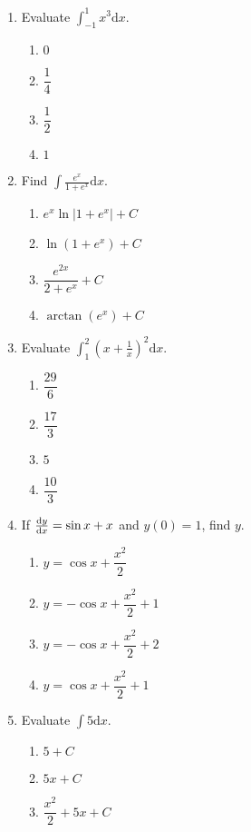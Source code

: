 \begin{multicols}{2}
\begin{enumerate}[label={\arabic*.}]
    \item Evaluate \(\displaystyle \int_{-1}^{1} x^3 \mathrm{d}x\).
      \begin{enumerate}[label={\Alph*.}]
        \item \(0\)
        \item \(\dfrac{1}{4}\)
        \item \(\dfrac{1}{2}\)
        \item \(1\)
      \end{enumerate}
    \item Find \(\displaystyle \int \frac{e^x}{1+e^x} \mathrm{d}x\).
      \begin{enumerate}[label={\Alph*.}]
        \item \(e^x \ln|1+e^x| + C\)
        \item \(\ln(1+e^x) + C\)
        \item \(\dfrac{e^{2x}}{2+e^x} + C\)
        \item \(\arctan(e^x) + C\)
      \end{enumerate}
    \item Evaluate \(\displaystyle \int_{1}^{2} (x+\frac{1}{x})^2 \mathrm{d}x\).
      \begin{enumerate}[label={\Alph*.}]
        \item \(\dfrac{29}{6}\)
        \item \(\dfrac{17}{3}\)
        \item \(5\)
        \item \(\dfrac{10}{3}\)
      \end{enumerate}
    \item If \(\frac{\mathrm{d}y}{\mathrm{d}x} = \sin x + x\) and \(y(0) = 1\), find \(y\).
      \begin{enumerate}[label={\Alph*.}]
        \item \(y = \cos x + \dfrac{x^2}{2}\)
        \item \(y = -\cos x + \dfrac{x^2}{2} + 1\)
        \item \(y = -\cos x + \dfrac{x^2}{2} + 2\)
        \item \(y = \cos x + \dfrac{x^2}{2} + 1\)
      \end{enumerate}
    \item Evaluate \(\displaystyle \int 5 \mathrm{d}x\).
      \begin{enumerate}[label={\Alph*.}]
        \item \(5+C\)
        \item \(5x+C\)
        \item \(\dfrac{x^2}{2} + 5x + C\)

\end{enumerate}
\end{enumerate}
\end{multicols}
